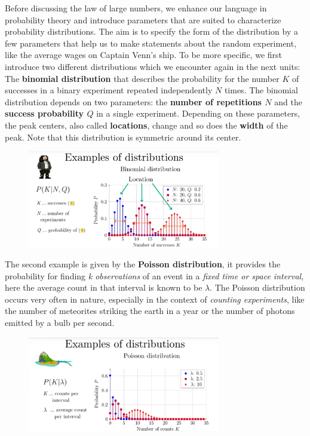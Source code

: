\documentclass[12pt, a4paper]{scrartcl}
\begin{document}
Before discussing the law of large numbers, we enhance our language in probability theory and introduce parameters that are suited to characterize probability distributions.
The aim is to specify the form of the distribution by a few parameters that help us to make statements about the random experiment, like the average wages on Captain Venn's ship.
To be more specific, we first introduce two different distributions which we encounter again in the next units:
The \textbf{binomial distribution} that describes the probability for the number $K$ of successes in a binary experiment repeated independently $N$ times. The binomial distribution depends on two parameters: the \textbf{number of repetitions $N$} and the \textbf{success probability $Q$} in a single experiment.
Depending on these parameters, the peak centers, also called \textbf{locations}, change and so does the \textbf{width} of the peak. Note that this distribution is symmetric around its center.
\begin{figure}[H]
	\centering
	\includegraphics[width=0.75\textwidth]{2_4.png}
\end{figure}
The second example is given by the \textbf{Poisson distribution}, it provides the probability for finding \textit{k observations} of an event in a \textit{fixed time or space interval}, here the average count in that interval is known to be $\lambda$. 
The Poisson distribution occurs very often in nature, especially in the context of \textit{counting experiments}, like the number of meteorites striking the earth in a year or the number of photons emitted by a bulb per second.\\
\begin{figure}[H]
	\centering
	\includegraphics[width=0.75\textwidth]{2_5.png}
\end{figure}
\end{document}
